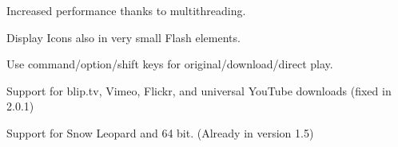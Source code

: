 \begin{changelog}
\item Increased performance thanks to multithreading.
\item Display Icons also in very small Flash elements.
\item Use command/option/shift keys for original/download/direct play.
\item Support for blip.tv, Vimeo, Flickr, and universal YouTube downloads (fixed in 2.0.1)
\item Support for Snow Leopard and 64 bit. (Already in version 1.5)
\end{changelog}
